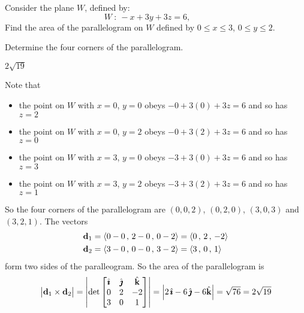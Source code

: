 \begin{question}[M200 2014A] %
Consider the plane $W$, defined by:
\begin{equation*}
W\ :\ -x + 3y + 3z = 6,\qquad
\end{equation*}
Find the area of the parallelogram on $W$ defined by 
$0 \le x \le 3$, $0 \le y \le 2$.
\end{question}

\begin{hint}
Determine the four corners of the parallelogram.
\end{hint}

\begin{answer}
$2\sqrt{19}$
\end{answer}

\begin{solution}
Note that 
\begin{itemize}
   \item the point on $W$ with $x=0$, $y=0$ obeys 
                         $-0+3(0)+3z=6$ and so has $z=2$
   \item the point on $W$ with $x=0$, $y=2$ obeys 
                         $-0+3(2)+3z=6$ and so has $z=0$
   \item the point on $W$ with $x=3$, $y=0$ obeys 
                         $-3+3(0)+3z=6$ and so has $z=3$
   \item the point on $W$ with $x=3$, $y=2$ obeys 
                         $-3+3(2)+3z=6$ and so has $z=1$
\end{itemize}
So the four corners of the parallelogram are 
$(0,0,2)$, $(0,2,0)$, $(3,0,3)$ and $(3,2,1)$. The vectors
\begin{align*}
\mathbf{d}_1&=\left< 0-0 \,,\, 2-0 \,,\, 0-2 \right> = \left< 0 \,,\, 2 \,,\, -2\right> \\
\mathbf{d}_2&=\left< 3-0 \,,\, 0-0 \,,\, 3-2 \right> = \left< 3 \,,\, 0 \,,\, 1\right> 
\end{align*}
form two sides of the paralleogram. So the area of the parallelogram is
\begin{align*}
\big|\mathbf{d}_1\times\mathbf{d}_2\big| 
=\left|\det\left[\begin{matrix}
                     \hat{\pmb{\imath}} & \hat{\pmb{\jmath}} & \hat{\mathbf{k}} \\
                     0   &  2  & -2 \\
                     3   &  0  &  1
                \end{matrix}\right]\right|
=\left| 2\,\hat{\pmb{\imath}} - 6\,\hat{\pmb{\jmath}} -6\hat{\mathbf{k}}  \right|
=\sqrt{76}
=2\sqrt{19}
\end{align*}

\end{solution}

